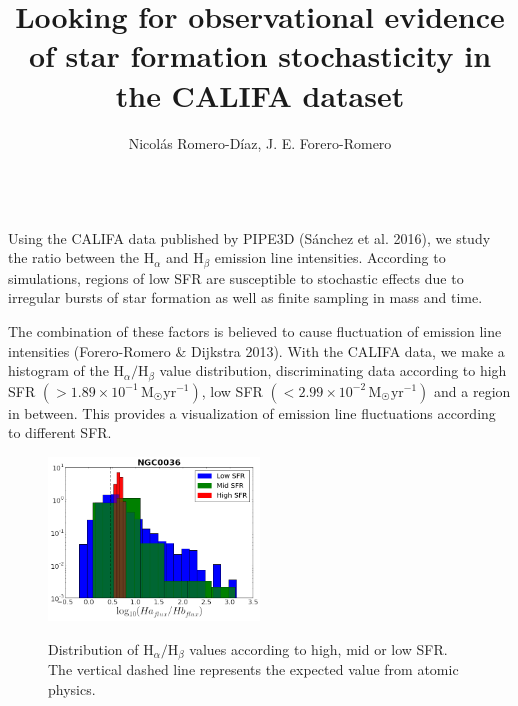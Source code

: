 \documentclass[preprint,proceedings]{rmaa}
\title{Looking for observational evidence of star formation stochasticity in the CALIFA dataset}
\author{Nicol\'as Romero-D\'iaz\altaffilmark{1}, J. E. Forero-Romero\altaffilmark{1}}
\begin{document}
\maketitle 


\\
 
Using the CALIFA data published by PIPE3D (S\'anchez et al. 2016), we study the
ratio between the H$_{\alpha}$ and H$_{\beta}$ emission line
intensities. According to simulations, regions of low SFR are
susceptible to stochastic effects due to irregular bursts of star
formation as well as finite sampling in mass and time. 

The combination of these factors is believed to cause fluctuation of
emission line intensities (Forero-Romero \& Dijkstra 2013). With the
CALIFA data, we make a histogram of the H$_{\alpha}/$H$_{\beta}$ value
distribution, discriminating data according to high SFR
$\left(>1.89\times10^{-1} \, \mathrm{M_{\astrosun}yr^{-1}}\right)$, low SFR $\left(<
2.99\times10^{-2} \, \mathrm{M_{\astrosun}yr^{-1}}\right)$ and a
region in between. This provides a visualization of emission line
fluctuations according to different SFR.   

\begin{figure}[h!]
\centering
\includegraphics[width=0.5\textwidth]{HIST_FINAL.png}
\label{fig1}
\caption{Distribution of H$_{\alpha}/$H$_{\beta}$ values according to
  high, mid or low SFR. The vertical dashed line represents the
  expected value from atomic physics.}
\centering
\end{figure}
\end{document}
